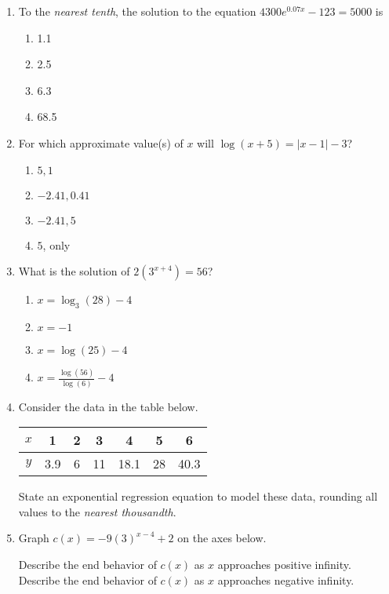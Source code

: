 \documentclass[12pt, twoside]{article}
\begin{document}
\begin{enumerate}[itemsep=0.5cm]
\item To the \emph{nearest tenth}, the solution to the equation $4300e^{0.07x} -123 = 5000$ is %
\begin{enumerate}
    \item 1.1
    \item 2.5
    \item 6.3
    \item 68.5
\end{enumerate}

\newpage
\item For which approximate value(s) of $x$ will $\log(x+5) = |x-1|-3$? %
\begin{enumerate}
    \item $5,1$
    \item $-2.41, 0.41$
    \item $-2.41, 5$
    \item $5$, only
\end{enumerate}

\item What is the solution of $2(3^{x+4})=56$? %
\begin{enumerate}
    \item $x=\log_3 (28) -4$
    \item $x=-1$
    \item $x=\log(25) -4$
    \item $\displaystyle x=\frac{\log(56)}{\log(6)} -4$
\end{enumerate}

\item Consider the data in the table below. %
\begin{center}
\begin{tabular}{|c|c|c|c|c|c|c|}
    \hline
$x$ & 1 & 2 & 3 & 4 & 5 & 6 \\
\hline
$y$ & 3.9 & 6 & 11 & 18.1 & 28 & 40.3 \\
\hline
\end{tabular}
\end{center}
State an exponential regression equation to model these data, rounding all values to the \emph{nearest thousandth}.

\newpage
\item Graph $c(x) = -9(3)^{x-4} + 2$ on the axes below. %
    \begin{center}
    \end{center}
    Describe the end behavior of $c(x)$ as $x$ approaches positive infinity. \\[2cm]
    Describe the end behavior of $c(x)$ as $x$ approaches negative infinity.


\end{enumerate}
\end{document}
